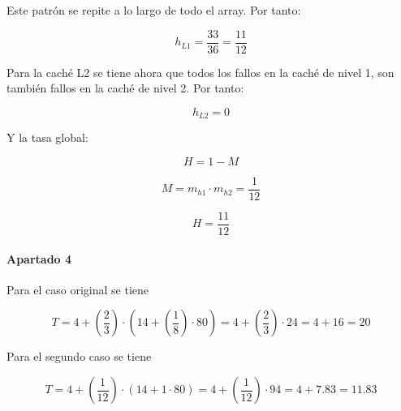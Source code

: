 Este patrón se repite a lo largo de todo el array. Por tanto:

\[
h_{L1} = 
\frac{33}{36} = \frac{11}{12}
\]

Para la caché L2 se tiene ahora que todos los fallos en la caché de nivel 1,
son también fallos en la caché de nivel 2. Por tanto:

\[
h_{L2} = 0
\]

Y la tasa global:

\[
H = 1 - M
\]

\[
M = m_{h1} \cdot m_{h2} = 
\frac{1}{12}
\]

\[
H = \frac{11}{12}
\]

\paragraph{Apartado 4}

Para el caso original se tiene

\[
T = 
4 + (\frac{2}{3}) \cdot (14 + (\frac{1}{8}) \cdot 80) = 
4 + (\frac{2}{3}) \cdot 24 = 
4 +16 = 
20
\]

Para el segundo caso se tiene

\[
T = 
4 + (\frac{1}{12}) \cdot (14 + 1 \cdot 80) = 
4 + (\frac{1}{12}) \cdot 94 = 
4 + 7.83 = 
11.83
\]


